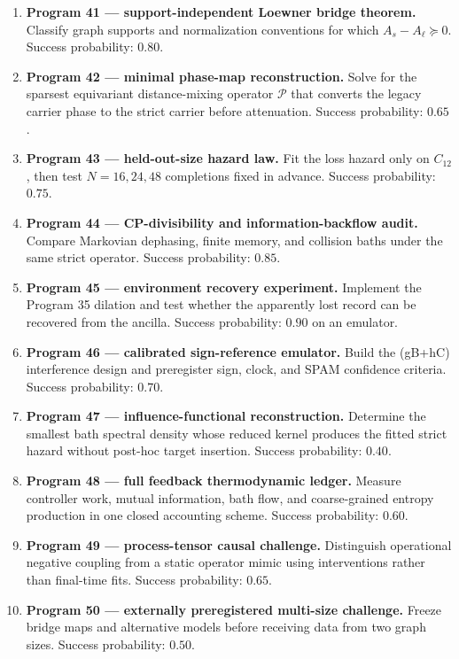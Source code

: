 \documentclass[11pt,a4paper,openany]{report}
\begin{document}
\begin{enumerate}
\item 
\textbf{Program 41 — support-independent Loewner bridge theorem.} Classify graph supports and normalization conventions for which \(A_s-A_\ell\succeq0\). Success probability: \(0.80\).

\item 
\textbf{Program 42 — minimal phase-map reconstruction.} Solve for the sparsest equivariant distance-mixing operator \(\mathcal{P}\) that converts the legacy carrier phase to the strict carrier before attenuation. Success probability: \(0.65\).

\item 
\textbf{Program 43 — held-out-size hazard law.} Fit the loss hazard only on \(C_{12}\), then test \(N=16,24,48\) completions fixed in advance. Success probability: \(0.75\).

\item 
\textbf{Program 44 — CP-divisibility and information-backflow audit.} Compare Markovian dephasing, finite memory, and collision baths under the same strict operator. Success probability: \(0.85\).

\item 
\textbf{Program 45 — environment recovery experiment.} Implement the Program 35 dilation and test whether the apparently lost record can be recovered from the ancilla. Success probability: \(0.90\) on an emulator.

\item 
\textbf{Program 46 — calibrated sign-reference emulator.} Build the (gB+hC) interference design and preregister sign, clock, and SPAM confidence criteria. Success probability: \(0.70\).

\item 
\textbf{Program 47 — influence-functional reconstruction.} Determine the smallest bath spectral density whose reduced kernel produces the fitted strict hazard without post-hoc target insertion. Success probability: \(0.40\).

\item 
\textbf{Program 48 — full feedback thermodynamic ledger.} Measure controller work, mutual information, bath flow, and coarse-grained entropy production in one closed accounting scheme. Success probability: \(0.60\).

\item 
\textbf{Program 49 — process-tensor causal challenge.} Distinguish operational negative coupling from a static operator mimic using interventions rather than final-time fits. Success probability: \(0.65\).

\item 
\textbf{Program 50 — externally preregistered multi-size challenge.} Freeze bridge maps and alternative models before receiving data from two graph sizes. Success probability: \(0.50\).

\end{enumerate}
\end{document}
